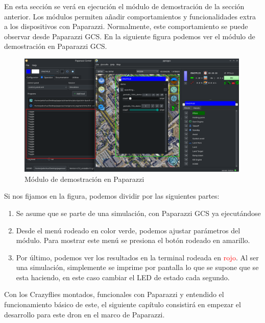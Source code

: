 En esta sección se verá en ejecución el módulo de demostración de la sección anterior. 
Los módulos permiten añadir comportamientos y funcionalidades extra a los dispositivos con Paparazzi. 
Normalmente, este comportamiento se puede observar desde Paparazzi GCS. 
En la siguiente figura podemos ver el módulo de demostración en Paparazzi GCS.

\begin{figure}[h]
    \centering
    \includegraphics[width=0.99\textwidth]{img/fig/fig2.10-demo-module.png}
    \caption{Módulo de demostración en Paparazzi}
    \label{fig:demo-module-paparazzi}
\end{figure}

Si nos fijamos en la figura, podemos dividir por las siguientes partes:

\begin{enumerate}
    \item Se asume que se parte de una simulación, con Paparazzi GCS ya ejecutándose

    \item Desde el menú rodeado en color \textcolor{Green3}{verde}, podemos ajustar parámetros del módulo. 
    Para mostrar este menú se presiona el botón rodeado en \textcolor{Gold3}{amarillo}.
    
    \item Por último, podemos ver los resultados en la terminal rodeada en \textcolor{red}{rojo}.
    Al ser una simulación, simplemente se imprime por pantalla lo que se supone que se esta haciendo,
    en este caso cambiar el LED de estado cada segundo.
\end{enumerate}

Con los Crazyflies montados, funcionales con Paparazzi y entendido el funcionamiento básico de este, 
el siguiente capítulo consistirá en empezar el desarrollo para este dron en el marco de Paparazzi.